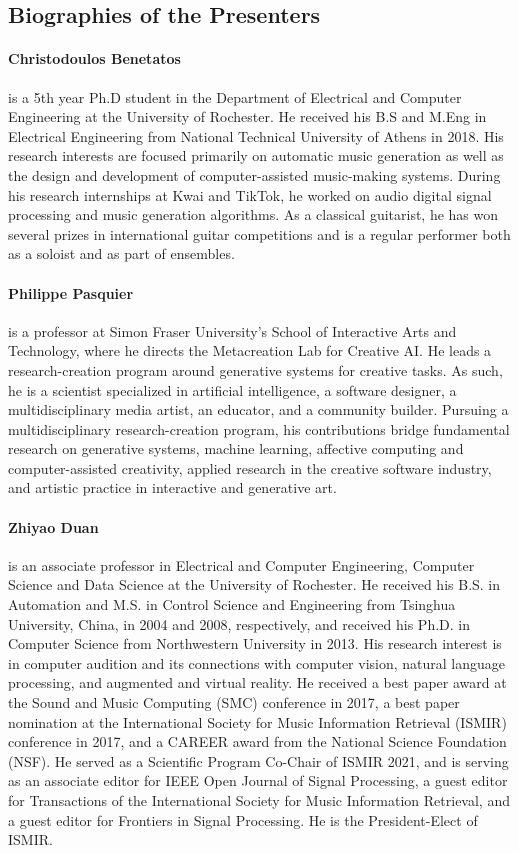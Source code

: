 \subsection*{Biographies of the Presenters}
\paragraph{Christodoulos Benetatos} is a 5th year Ph.D student in the Department of Electrical and Computer Engineering at the University of Rochester. He received his B.S and M.Eng in Electrical Engineering from National Technical University of Athens in 2018. His research interests are focused primarily on automatic music generation as well as the design and development of computer-assisted music-making systems. During his research internships at Kwai and TikTok, he worked on audio digital signal processing and music generation algorithms. As a classical guitarist, he has won several prizes in international guitar competitions and is a regular performer both as a soloist and as part of ensembles.

\paragraph{Philippe Pasquier} is a professor at Simon Fraser University's School of Interactive Arts and Technology, where he directs the Metacreation Lab for Creative AI. He leads a research-creation program around generative systems for creative tasks. As such, he is a scientist specialized in artificial intelligence, a software designer, a multidisciplinary media artist, an educator, and a community builder. Pursuing a multidisciplinary research-creation program, his contributions bridge fundamental research on generative systems, machine learning, affective computing and computer-assisted creativity, applied research in the creative software industry, and artistic practice in interactive and generative art.

\paragraph{Zhiyao Duan} is an associate professor in Electrical and Computer Engineering, Computer Science and Data Science at the University of Rochester. He received his B.S. in Automation and M.S. in Control Science and Engineering from Tsinghua University, China, in 2004 and 2008, respectively, and received his Ph.D. in Computer Science from Northwestern University in 2013. His research interest is in computer audition and its connections with computer vision, natural language processing, and augmented and virtual reality. He received a best paper award at the Sound and Music Computing (SMC) conference in 2017, a best paper nomination at the International Society for Music Information Retrieval (ISMIR) conference in 2017, and a CAREER award from the National Science Foundation (NSF). He served as a Scientific Program Co-Chair of ISMIR 2021, and is serving as an associate editor for IEEE Open Journal of Signal Processing, a guest editor for Transactions of the International Society for Music Information Retrieval, and a guest editor for Frontiers in Signal Processing. He is the President-Elect of ISMIR.


